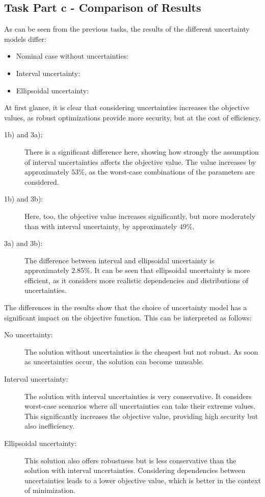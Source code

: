 \documentclass[a4paper,12pt]{article}
\begin{document}
\subsection*{Task Part c - Comparison of Results}

As can be seen from the previous tasks, the results of the different uncertainty models differ:
\begin{itemize}
    \item Nominal case without uncertainties: 
    \item Interval uncertainty: 
    \item Ellipsoidal uncertainty: 
\end{itemize}
At first glance, it is clear that considering uncertainties increases the objective values, as robust optimizations provide more security, but at the cost of efficiency.
\begin{description}
    \item[1b) and 3a):] There is a significant difference here, showing how strongly the assumption of interval uncertainties affects the objective value. The value increases by approximately $53\%$, as the worst-case combinations of the parameters are considered.
    \item[1b) and 3b):] Here, too, the objective value increases significantly, but more moderately than with interval uncertainty, by approximately $49\%$.
    \item[3a) and 3b):] The difference between interval and ellipsoidal uncertainty is approximately $2.85\%$. It can be seen that ellipsoidal uncertainty is more efficient, as it considers more realistic dependencies and distributions of uncertainties.
\end{description}
The differences in the results show that the choice of uncertainty model has a significant impact on the objective function. This can be interpreted as follows:
\begin{description}
    \item[No uncertainty:] The solution without uncertainties is the cheapest but not robust. As soon as uncertainties occur, the solution can become unusable.
    \item[Interval uncertainty:] The solution with interval uncertainties is very conservative. It considers worst-case scenarios where all uncertainties can take their extreme values. This significantly increases the objective value, providing high security but also inefficiency.
    \item[Ellipsoidal uncertainty:] This solution also offers robustness but is less conservative than the solution with interval uncertainties. Considering dependencies between uncertainties leads to a lower objective value, which is better in the context of minimization.
\end{description}
\end{document}

